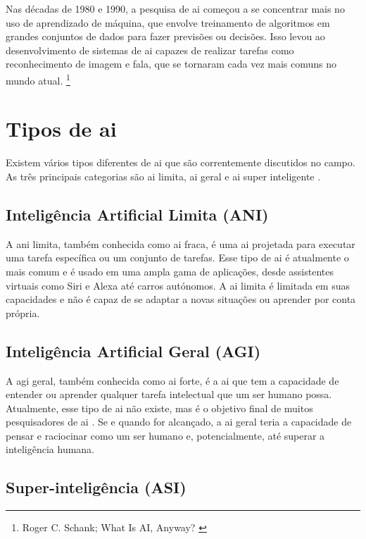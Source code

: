 \documentclass{report}
\begin{document}
Nas décadas de 1980 e 1990, a pesquisa de \ac{ai} começou a se concentrar mais no uso de aprendizado de máquina, que envolve treinamento de algoritmos em grandes conjuntos de dados para fazer previsões ou decisões. Isso levou ao desenvolvimento de sistemas de \ac{ai} capazes de realizar tarefas como reconhecimento de imagem e fala, que se tornaram cada vez mais comuns no mundo atual.
\footnote{Roger C. Schank; What Is AI, Anyway? \cite{paper1}}


\chapter{Tipos de \ac{ai}}


Existem vários tipos diferentes de \ac{ai} que são correntemente discutidos no campo. As três principais categorias são \ac{ai} limita, \ac{ai} geral e \ac{ai} super inteligente \cite{tiposdeai}.

\section{Inteligência Artificial Limita (ANI)}

A \ac{ani} limita, também conhecida como \ac{ai} fraca, é uma \ac{ai} projetada para executar uma tarefa específica ou um conjunto de tarefas. Esse tipo de \ac{ai} é atualmente o mais comum e é usado em uma ampla gama de aplicações, desde assistentes virtuais como Siri e Alexa até carros autónomos. A \ac{ai} limita é limitada em suas capacidades e não é capaz de se adaptar a novas situações ou aprender por conta própria.

\section{Inteligência Artificial Geral (AGI)}

A \ac{agi} geral, também conhecida como \ac{ai} forte, é a \ac{ai} que tem a capacidade de entender ou aprender qualquer tarefa intelectual que um ser humano possa. Atualmente, esse tipo de \ac{ai} não existe, mas é o objetivo final de muitos pesquisadores de \ac{ai} . Se e quando for alcançado, a \ac{ai} geral teria a capacidade de pensar e raciocinar como um ser humano e, potencialmente, até superar a inteligência humana.

\section{Super-inteligência (ASI)}
\end{document}
